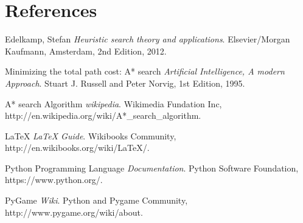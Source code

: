 \chapter{References}
\begin{thebibliography}{9}

  Edelkamp, Stefan
  \emph{Heuristic search theory and applications}.
  Elsevier/Morgan Kaufmann, Amsterdam,
  2nd Edition,
  2012.

  Minimizing the total path cost: A* search
  \emph{Artificial Intelligence, A modern Approach}.
  Stuart J. Russell and Peter Norvig,
  1st Edition,
  1995.

  A* search Algorithm
  \emph{wikipedia}.
  Wikimedia Fundation Inc,
  http://en.wikipedia.org/wiki/A*\_search\_algorithm.

  LaTeX
  \emph{LaTeX Guide}.
  Wikibooks Community,
  http://en.wikibooks.org/wiki/LaTeX/.

  Python Programming Language
  \emph{Documentation}.
  Python Software Foundation,
  https://www.python.org/.


  PyGame
  \emph{Wiki}.
  Python and Pygame Community,
  http://www.pygame.org/wiki/about.
  
  
  
\end{thebibliography}
